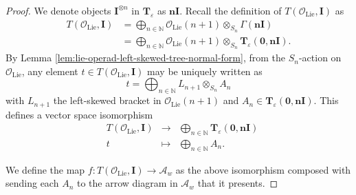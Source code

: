 \begin{proof}
	We denote objects \(\mathbf{I}^{\otimes n}\) in \(\mathbf{T}_{\varepsilon}\) as \(\mathbf{nI}\). Recall the definition of \(T(\mathcal{O}_{\text{Lie}}, \mathbf{I})\) as
	\begin{align*}
		T(\mathcal{O}_{\text{Lie}}, \mathbf{I})
		& = \bigoplus_{n \in \mathbb{N}} \mathcal{O}_{\text{Lie}}(n + 1) \otimes_{S_{n}} \Gamma(\mathbf{nI}) \\
		& = \bigoplus_{n \in \mathbb{N}} \mathcal{O}_{\text{Lie}}(n + 1) \otimes_{S_{n}} \mathbf{T}_{\varepsilon}(\mathbf{0}, \mathbf{nI}).
	\end{align*}
	By Lemma \ref{lem:lie-operad-left-skewed-tree-normal-form}, from the \(S_{n}\)-action on \(\mathcal{O}_{\text{Lie}}\), any element \(t \in T(\mathcal{O}_{\text{Lie}}, \mathbf{I})\) may be uniquely written as
	\[
		t
		=
		\bigoplus_{n \in \mathbb{N}} L_{n + 1} \otimes_{S_{n}} A_{n}
	\]
	with \(L_{n + 1}\) the left-skewed bracket in \(\mathcal{O}_{\text{Lie}}(n + 1)\) and \(A_{n} \in \mathbf{T}_{\varepsilon}(\mathbf{0}, \mathbf{nI})\). This defines a vector space isomorphism
	\[
		\begin{array}{rccc}
			& T(\mathcal{O}_{\text{Lie}}, \mathbf{I})
			& \longrightarrow
			& \displaystyle \bigoplus_{n \in \mathbb{N}} \mathbf{T}_{\varepsilon}(\mathbf{0}, \mathbf{nI})\\
			& t
			& \longmapsto
			& \displaystyle \bigoplus_{n \in \mathbb{N}} A_{n}.
		\end{array}
	\]

	We define the map \(f: T(\mathcal{O}_{\text{Lie}}, \mathbf{I}) \to \mathcal{A}_{w}\) as the above isomorphism composed with sending each \(A_{n}\) to the arrow diagram in \(\mathcal{A}_{w}\) that it presents.


\end{proof}
